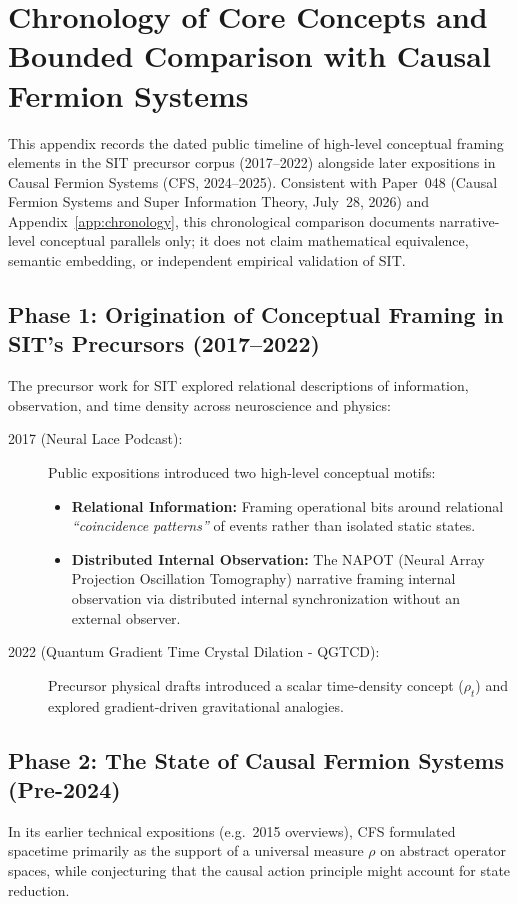 \documentclass[american,11pt,letterpaper]{article}
\def\emph#1{#1}%
\begin{document}
\section{Chronology of Core Concepts and Bounded Comparison with Causal Fermion Systems}
\label{app:cfs-chronology}

This appendix records the dated public timeline of high-level conceptual framing elements in the SIT precursor corpus (2017--2022) alongside later expositions in Causal Fermion Systems (CFS, 2024--2025). Consistent with Paper~048 (\emph{Causal Fermion Systems and Super Information Theory}, July~28, 2026) and Appendix~\ref{app:chronology}, this chronological comparison documents \emph{narrative-level conceptual parallels only}; it does \emph{not} claim mathematical equivalence, semantic embedding, or independent empirical validation of SIT.

\subsection{Phase 1: Origination of Conceptual Framing in SIT's Precursors (2017--2022)}
The precursor work for SIT explored relational descriptions of information, observation, and time density across neuroscience and physics:

\begin{description}
    \item[2017 (Neural Lace Podcast):] Public expositions introduced two high-level conceptual motifs:
    \begin{itemize}
        \item \textbf{Relational Information:} Framing operational bits around relational \textit{``coincidence patterns''} of events rather than isolated static states.
        \item \textbf{Distributed Internal Observation:} The NAPOT (Neural Array Projection Oscillation Tomography) narrative framing internal observation via distributed internal synchronization without an external observer.
    \end{itemize}
    \item[2022 (Quantum Gradient Time Crystal Dilation - QGTCD):] Precursor physical drafts introduced a scalar time-density concept ($\rho_t$) and explored gradient-driven gravitational analogies.
\end{description}

\subsection{Phase 2: The State of Causal Fermion Systems (Pre-2024)}
In its earlier technical expositions (e.g.\ 2015 overviews), CFS formulated spacetime primarily as the support of a universal measure $\rho$ on abstract operator spaces, while conjecturing that the causal action principle might account for state reduction.
\end{document}
